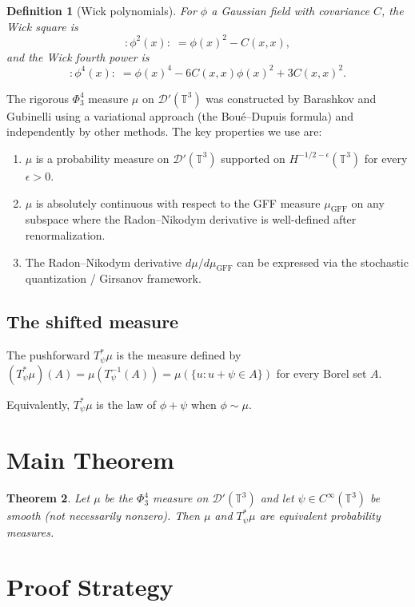 \documentclass[12pt]{article}
\newtheorem{theorem}{Theorem}
\newtheorem{definition}[theorem]{Definition}
\begin{document}
\begin{definition}[Wick polynomials]
For $\phi$ a Gaussian field with covariance $C$, the Wick square is
\[
:\!\phi^2(x)\!: \;= \phi(x)^2 - C(x,x),
\]
and the Wick fourth power is
\[
:\!\phi^4(x)\!: \;= \phi(x)^4 - 6C(x,x)\phi(x)^2 + 3C(x,x)^2.
\]
\end{definition}

The rigorous $\Phi^4_3$ measure $\mu$ on $\mathcal{D}'(\mathbb{T}^3)$ was constructed by Barashkov and Gubinelli \cite{BG2020} using a variational approach (the Bou\'{e}--Dupuis formula) and independently by other methods. The key properties we use are:
\begin{enumerate}
\item[(P1)] $\mu$ is a probability measure on $\mathcal{D}'(\mathbb{T}^3)$ supported on $H^{-1/2-\epsilon}(\mathbb{T}^3)$ for every $\epsilon > 0$.
\item[(P2)] $\mu$ is absolutely continuous with respect to the GFF measure $\mu_{\mathrm{GFF}}$ on any subspace where the Radon--Nikodym derivative is well-defined after renormalization.
\item[(P3)] The Radon--Nikodym derivative $d\mu/d\mu_{\mathrm{GFF}}$ can be expressed via the stochastic quantization / Girsanov framework.
\end{enumerate}

\subsection{The shifted measure}

The pushforward $T_\psi^* \mu$ is the measure defined by $(T_\psi^* \mu)(A) = \mu(T_\psi^{-1}(A)) = \mu(\{u : u + \psi \in A\})$ for every Borel set $A$.

Equivalently, $T_\psi^* \mu$ is the law of $\phi + \psi$ when $\phi \sim \mu$.

\section{Main Theorem}

\begin{theorem}\label{thm:main}
Let $\mu$ be the $\Phi^4_3$ measure on $\mathcal{D}'(\mathbb{T}^3)$ and let $\psi \in C^\infty(\mathbb{T}^3)$ be smooth (not necessarily nonzero). Then $\mu$ and $T_\psi^* \mu$ are equivalent probability measures.
\end{theorem}

\section{Proof Strategy}
\end{document}
